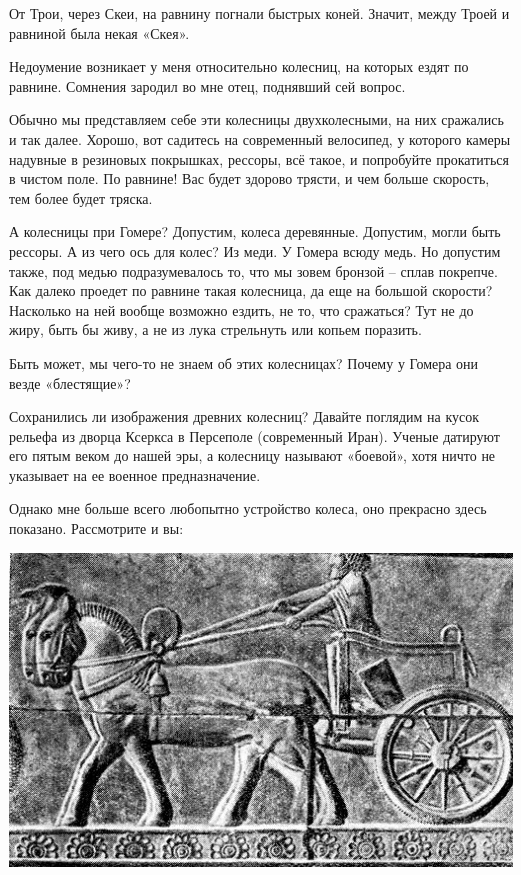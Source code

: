 От Трои, через Скеи, на равнину погнали быстрых коней. Значит, между Троей и равниной была некая «Скея».

Недоумение возникает у меня относительно колесниц, на которых ездят по равнине. Сомнения зародил во мне отец, поднявший сей вопрос.

Обычно мы представляем себе эти колесницы двухколесными, на них сражались и так далее. Хорошо, вот садитесь на современный велосипед, у которого камеры надувные в резиновых покрышках, рессоры, всё такое, и попробуйте прокатиться в чистом поле. По равнине! Вас будет здорово трясти, и чем больше скорость, тем более будет тряска.

А колесницы при Гомере? Допустим, колеса деревянные. Допустим, могли быть рессоры. А из чего ось для колес? Из меди. У Гомера всюду медь. Но допустим также, под медью подразумевалось то, что мы зовем бронзой – сплав покрепче. Как далеко проедет по равнине такая колесница, да еще на большой скорости? Насколько на ней вообще возможно ездить, не то, что сражаться? Тут не до жиру, быть бы живу, а не из лука стрельнуть или копьем поразить.

Быть может, мы чего-то не знаем об этих колесницах? Почему у Гомера они везде «блестящие»?

Сохранились ли изображения древних колесниц? Давайте поглядим на кусок рельефа из дворца Ксеркса в Персеполе (современный Иран). Ученые датируют его пятым веком до нашей эры, а колесницу называют «боевой», хотя ничто не указывает на ее военное предназначение.

Однако мне больше всего любопытно устройство колеса, оно прекрасно здесь показано. Рассмотрите и вы:

\begin{center}
\includegraphics[width=\textwidth]{chast-troya/gomer/kolesn.jpg}
\end{center}

